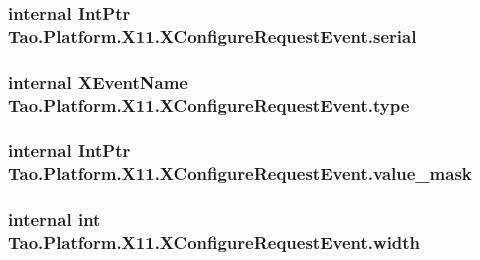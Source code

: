 \label{struct_tao_1_1_platform_1_1_x11_1_1_x_configure_request_event_a85c9d13d94371e1e72b75f4741798227}
\hypertarget{struct_tao_1_1_platform_1_1_x11_1_1_x_configure_request_event_a7b5cdb8930b6b8e4295042b6489c581f}{
\subsubsection[{serial}]{\setlength{\rightskip}{0pt plus 5cm}internal IntPtr {\bf Tao.Platform.X11.XConfigureRequestEvent.serial}}}
\label{struct_tao_1_1_platform_1_1_x11_1_1_x_configure_request_event_a7b5cdb8930b6b8e4295042b6489c581f}
\hypertarget{struct_tao_1_1_platform_1_1_x11_1_1_x_configure_request_event_a4f46a26bf1853d568ea113e23dc56b24}{
\subsubsection[{type}]{\setlength{\rightskip}{0pt plus 5cm}internal {\bf XEventName} {\bf Tao.Platform.X11.XConfigureRequestEvent.type}}}
\label{struct_tao_1_1_platform_1_1_x11_1_1_x_configure_request_event_a4f46a26bf1853d568ea113e23dc56b24}
\hypertarget{struct_tao_1_1_platform_1_1_x11_1_1_x_configure_request_event_aa479d0a49227c4e7955763ed7929ca90}{
\subsubsection[{value\_\-mask}]{\setlength{\rightskip}{0pt plus 5cm}internal IntPtr {\bf Tao.Platform.X11.XConfigureRequestEvent.value\_\-mask}}}
\label{struct_tao_1_1_platform_1_1_x11_1_1_x_configure_request_event_aa479d0a49227c4e7955763ed7929ca90}
\hypertarget{struct_tao_1_1_platform_1_1_x11_1_1_x_configure_request_event_aeac9e69e4425eb3e0c115ab5c1ad321d}{
\subsubsection[{width}]{\setlength{\rightskip}{0pt plus 5cm}internal int {\bf Tao.Platform.X11.XConfigureRequestEvent.width}}}
